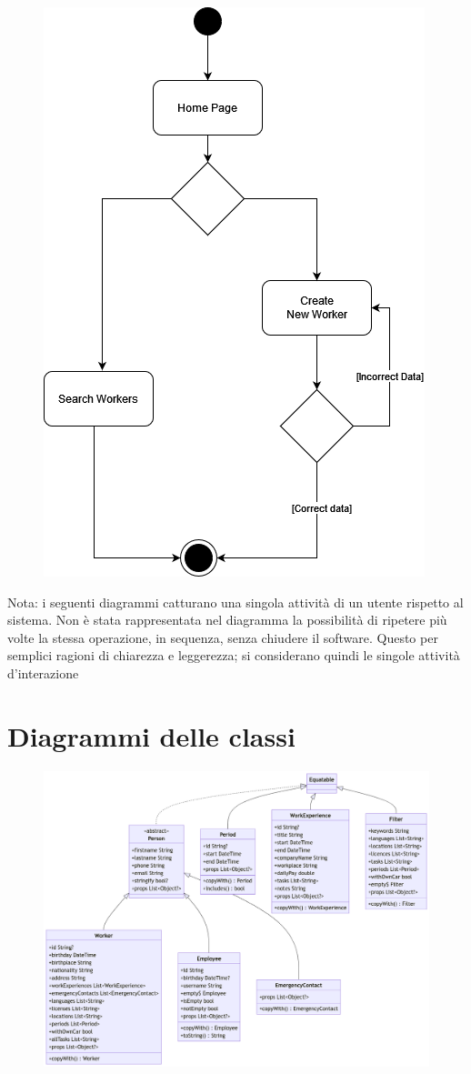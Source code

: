 \documentclass[a4paper, oneside, 12pt]{article}
\begin{document}
\begin{figure}[H]
	\centering
	\includegraphics[width = 10 cm]{images/attivitadipendenti.png}
	\label{fig:attività dipendenti}
\end{figure}

Nota: i seguenti diagrammi catturano una singola attività di un utente rispetto al sistema. Non è stata rappresentata nel diagramma la possibilità di ripetere più volte la stessa operazione, in sequenza, senza chiudere il software. Questo per semplici ragioni di chiarezza e leggerezza; si considerano quindi le singole attività d'interazione

\section{Diagrammi delle classi}

\begin{figure}[H]
	\centering
	\includegraphics[width = 10 cm]{images/uml_1.png}
	\label{fig:attività dipendenti}
\end{figure}
\end{document}
